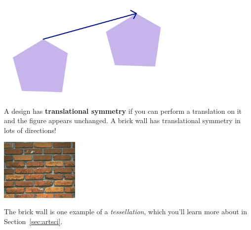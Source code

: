 \begin{center}
\includegraphics[height=5cm]{vectrans}
\end{center}

A design has {\bf translational symmetry} if you can perform a translation on it and the figure appears unchanged.  A brick wall has translational symmetry in lots of directions!

\begin{center}\label{pic:trans1}
\includegraphics[height=3cm]{brickwall}
\end{center}
The brick wall is one example of a \emph{tessellation}, which you'll learn more about in Section~\ref{sec:artsci}.

